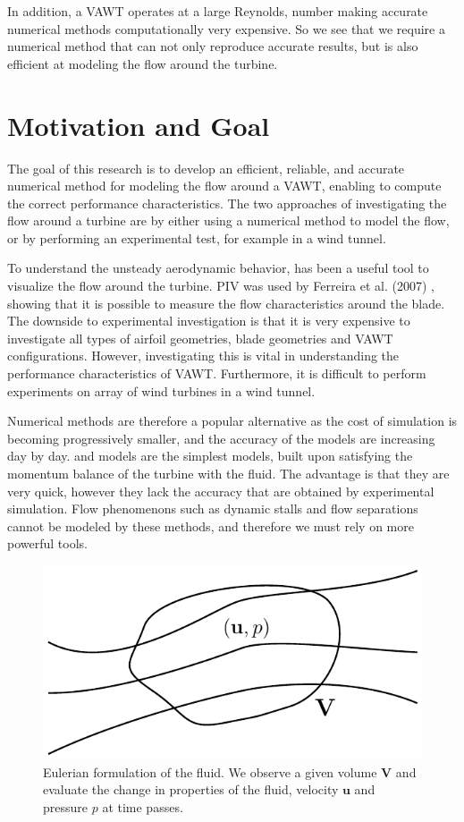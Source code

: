 In addition, a VAWT operates at a large Reynolds, number making accurate numerical methods computationally very expensive. So we see that we require a numerical method that can not only reproduce accurate results, but is also efficient at modeling the flow around the turbine.

\section{Motivation and Goal}
The goal of this research is to develop an efficient, reliable, and accurate numerical method for modeling the flow around a  VAWT, enabling to compute the correct performance characteristics. The two approaches of investigating the flow around a turbine are by either using a numerical method to model the flow, or by performing an experimental test, for example in a wind tunnel.

To understand the unsteady aerodynamic behavior,  has been a useful tool to visualize the flow around the turbine. PIV was used by Ferreira et al. (2007) \cite{Ferreira2007a}, showing that it is possible to measure the flow characteristics around the blade. The downside to experimental investigation is that it is very expensive to investigate all types of airfoil geometries, blade geometries and VAWT configurations. However, investigating this is vital in understanding the performance characteristics of VAWT. Furthermore, it is difficult to perform experiments on array of wind turbines in a wind tunnel.

Numerical methods are therefore a popular alternative as the cost of simulation is becoming progressively smaller, and the accuracy of the models are increasing day by day.  and  models are the simplest models, built upon satisfying the momentum balance of the turbine with the fluid. The advantage is that they are very quick, however they lack the accuracy that are obtained by experimental simulation. Flow phenomenons such as dynamic stalls and flow separations cannot be modeled by these methods, and therefore we must rely on more powerful tools.

	\begin{figure}[!t]
		\centering
		\includegraphics[width=0.6\linewidth]{figures/introduction/eulerianRF.pdf}
		\caption{Eulerian formulation of the fluid. We observe a given volume $\mathbf{V}$ and evaluate the change in properties of the fluid, velocity $\mathbf{u}$ and pressure $p$ at time passes.}
		\label{fig:eulerianRF}
	\end{figure}

